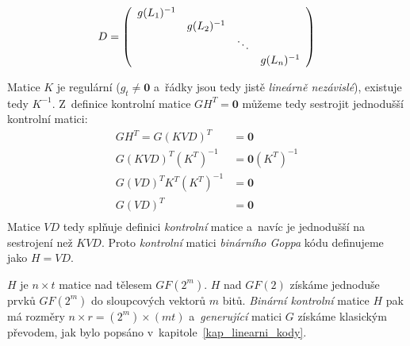 \documentclass[thesis=M,czech,hidelinks]{FITthesis}[2012/06/26]
\newcommand{\0}{{\textcolor[gray]{0.75}{0}}}
\begin{document}
$$
    D = \left(\begin{array}{c c c c}
        g(L_1)^{-1} &             &        &             \\
                    & g(L_2)^{-1} &        &             \\
                    &             & \ddots &             \\
                    &             &        & g(L_n)^{-1} \\
    \end{array}\right)
$$

Matice $K$ je regulární ($g_t \neq \mathbf{0}$ a~řádky jsou tedy jistě
\emph{lineárně nezávislé}), existuje tedy $K^{-1}$. Z~definice kontrolní matice
$GH^T = \mathbf{0}$ můžeme tedy sestrojit jednodušší kontrolní matici:
\begin{align*}
    G H^T = G (KVD)^T                   &= \mathbf{0} \\
    G (KVD)^T\left(K^T\right)^{-1}      &= \mathbf{0} \left(K^T\right)^{-1} \\
    G (VD)^T K^T \left(K^T\right)^{-1}  &= \mathbf{0} \\
    G (VD)^T                            &= \mathbf{0} \\
\end{align*}
Matice $VD$ tedy splňuje definici \emph{kontrolní} matice a~navíc je jednodušší
na sestrojení než $KVD$. Proto \emph{kontrolní} matici \emph{binárního Goppa}
kódu definujeme jako $H=VD$.

$H$ je $n \times t$ matice nad tělesem $GF(2^m)$. $H$ nad $GF(2)$ získáme
jednoduše  prvků $GF(2^m)$ do sloupcových vektorů $m$ bitů.
\emph{Binární kontrolní} matice $H$ pak má rozměry $n \times r =
(2^m) \times (mt)$ a~\emph{generující} matici $G$ získáme klasickým převodem,
jak bylo popsáno v~kapitole~\ref{kap_linearni_kody}.
\end{document}
